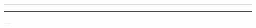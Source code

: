 \documentclass[../thesis.tex]{subfiles}
\begin{document}
\begin{center}
\begin{minipage}{0.5\textwidth}
\begin{center}
            \noindent\supervisor
            
            \noindent\rule{6cm}{0.4pt}
            
            \noindent{}
            
             \rule{6cm}{0.4pt}
            
            \noindent{}
        \end{center}
    \end{minipage}

\vfill

    \noindent\place{} –-- \the\year{}

\end{center}
\end{document}
